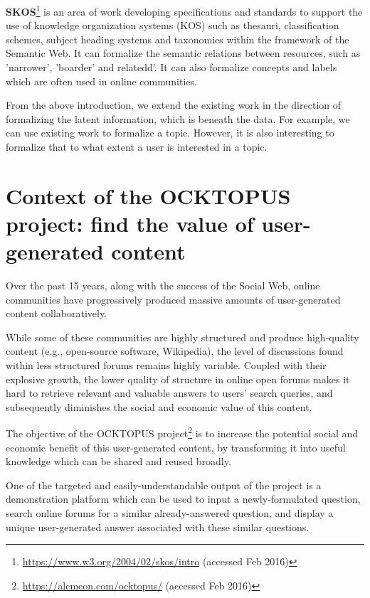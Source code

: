 \textbf{SKOS}\footnote{\url{https://www.w3.org/2004/02/skos/intro} (accessed Feb 2016)} is an area of work developing specifications and standards to support the use of knowledge organization systems (KOS) such as thesauri, classification schemes, subject heading systems and taxonomies within the framework of the Semantic Web. It can formalize the semantic relations between resources, such as 'narrower', 'boarder' and relatedd'. It can also formalize concepts and labels which are often used in online communities.
 
From the above introduction, we extend the existing work in the direction of formalizing the latent information, which  is beneath the data. For example, we can use existing work to formalize a topic. However, it is also interesting to formalize that to what extent a user is interested in a topic.
 
\section{Context of the OCKTOPUS project: find the value of user-generated content}
Over the past 15 years, along with the success of the Social Web, online communities have progressively produced massive amounts of user-generated content collaboratively.

While some of these communities are highly structured and produce high-quality content (e.g., open-source software, Wikipedia), the level of discussions found within less structured forums remains highly variable. Coupled with their explosive growth, the lower quality of structure in online open forums makes it hard to retrieve relevant and valuable answers to users' search queries, and subsequently diminishes the social and economic value of this content.

The objective of the OCKTOPUS project\footnote{\url{https://alcmeon.com/ocktopus/} (accessed Feb 2016) } is to increase the potential social and economic benefit of this user-generated content, by transforming it into useful knowledge which can be shared and reused broadly.

One of the targeted and easily-understandable output of the project is a demonstration platform which can be used to input a newly-formulated question, search online forums for a similar already-answered question, and display a unique user-generated answer associated with these similar questions.

